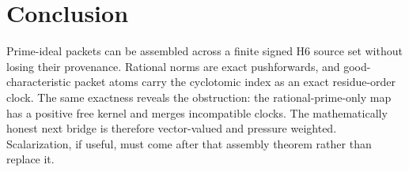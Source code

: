 \documentclass[11pt]{article}
\theoremstyle{definition}\newtheorem{definition}[theorem]{Definition}
\theoremstyle{remark}\newtheorem{remark}[theorem]{Remark}
\begin{document}
\section{Conclusion}

Prime-ideal packets can be assembled across a finite signed H6 source set
without losing their provenance.  Rational norms are exact pushforwards, and
good-characteristic packet atoms carry the cyclotomic index as an exact
residue-order clock.  The same exactness reveals the obstruction: the
rational-prime-only map has a positive free kernel and merges incompatible
clocks.  The mathematically honest next bridge is therefore vector-valued
and pressure weighted.  Scalarization, if useful, must come after that
assembly theorem rather than replace it.



\end{document}
